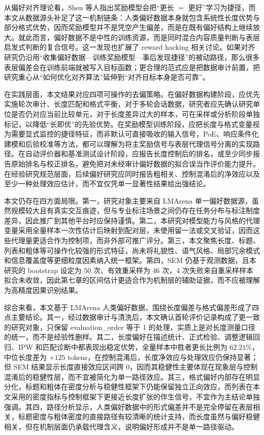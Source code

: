 \documentclass[9pt,a4paper,fontset=windows]{ctexart}
\theoremstyle{definition}
\numberwithin{equation}{section}
\begin{document}
从偏好对齐理论看，Shen 等人指出奖励模型会把“更长 \(=\) 更好”学习为捷径，而本文从数据源头补足了这一机制链条：人类偏好数据本身就包含系统性长度优势与部分格式优势，因而奖励模型并不是凭空产生偏差，而是在既有偏好结构上继续放大。就此而言，偏好数据不是中性的训练资源，而是同时混合内容质量判断与表层启发式判断的复合信号。这一发现也扩展了 reward hacking 相关讨论。如果对齐研究仍沿用“收集偏好数据—训练奖励模型—事后发现捷径”的被动路径，那么很多表层偏差会在训练前端就被写入目标函数；更合理的范式应是把数据审计前置，把研究重心从“如何优化对齐算法”延伸到“对齐目标本身是否可靠”。

在实践层面，本文结果对应四项可操作的去偏策略。在偏好数据构建阶段，应优先实施轮次审计、长度匹配和格式平衡，对于多轮会话数据，研究者应先确认研究单位是否仍对应当前比较单元，对于长度差异过大的样本，可在采样或分析阶段单独标记，以降低“长即优”的先验优势。在奖励模型训练阶段，应把长度与格式变量视为需要显式监控的捷径特征，而非默认可直接吸收的输入信号，PoE、响应条件化建模和后验校准等方法，都可以理解为将主奖励信号与表层代理信号分离的实现路径。在自动评价器和基准测试设计阶段，应报告长度控制后的排名，或至少同步报告原始排名与校正排名，避免把对未经审计偏好数据的拟合误当作评价能力提升。在经验研究规范层面，后续偏好研究应同时报告粗相关、控制混淆后的净效应以及至少一种处理效应估计，而不宜仅凭单一显著性结果给出强结论。

本文仍存在四方面局限。第一，研究对象主要来自 LMArena 单一偏好数据源，虽然规模较大且有真实交互痕迹，但与专业标注场景之间仍存在任务分布与标注制度差异，因此推广到其他平台时应保持谨慎。第二，本研究对模型能力与风格的代理变量采用全量样本一次性估计后映射到配对层，未使用留一法或交叉验证，因而这些代理量更适合作为控制项，而非外部可推广评分。第三，本文聚焦长度、标题、列表和粗体等可操作化较强的形式特征，尚未将礼貌性、语气风格、局部冗余模式和信息覆盖度等更细粒度因素纳入统一框架。第四，SEM 仍基于观测数据，且本研究的 bootstrap 设定为 50 次、有效重采样为 46 次，4 次失败来自重采样样本拟合未收敛，因此第七章的区间估计更适合作为机制层的辅助证据，而不应被理解为高精度因果识别结果。

综合来看，本文基于 LMArena 人类偏好数据，围绕长度偏差与格式偏差形成了四点主要结论。其一，经过数据审计与清洗后，本文确认首轮评价记录构成了更一致的研究对象，只保留 evaluation\_order 等于 1 的处理，实质上是对长度测量口径的统一，而不是经验性删样。其二，长度偏好在描述统计、正式检验、调整逻辑回归、IPW 和匹配诊断中都表现出稳定优势，全量样本中胜者更长比例为 \(62.21\%\)，中位长度差为 \(+125\) tokens，在控制混淆后，长度净效应与处理效应仍保持显著；但 SEM 结果显示长度直接效应区间跨 0，因而其稳健性主要体现在现象层与控制混淆后的稳健性层，而不宜被简化为单一路径效应。其三，格式偏好内部存在明显分化，标题和粗体在密度分析与稳健性框架下仍能保留独立正向效应，而列表在本文采用的密度指标与控制框架下更接近长度扩张的伴生信号，不宜作为主结论单独强调。其四，路径分析显示，人类偏好数据中的形式偏差并不是完全停留在表层相关，标题密度与粗体密度的直接路径有较清晰的统计支持，而长度虽然与偏好稳健相关，但在机制层面仍承载代理含义，说明偏好形成并不是单一路径驱动。
\end{document}
